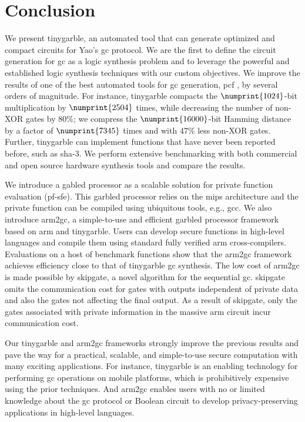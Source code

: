 \chapter{Conclusion}\label{chap:conclusion}
We present \gls{tinygarble}, an automated tool that can generate optimized and compact circuits for Yao's \acrfull{gc} protocol.
We are the first to define the circuit generation for \acrshort{gc} as a logic synthesis problem and to leverage the powerful and established logic synthesis techniques with our custom objectives.
We improve the results of one of the best automated tools for \acrshort{gc} generation, \gls{pcf} \cite{kreuter2013pcf}, by several orders of magnitude. For instance, \gls{tinygarble} compacts the $\numprint{1024}$-bit multiplication by $\numprint{2504}$ times, while decreasing the number of non-XOR gates by 80\%; we compress the $\numprint{16000}$-bit Hamming distance by a factor of $\numprint{7345}$ times and with 47\% less non-XOR gates.
Further, \gls{tinygarble} can implement functions that have never been reported before, such as \acrshort{sha}-3.
We perform extensive benchmarking with both commercial and open source hardware synthesis tools and compare the results.

We introduce a gabled processor as a scalable solution for private function evaluation (\acrshort{pf-sfe}).
This garbled processor relies on the \gls{mips} architecture and the private function can be compiled using ubiquitous tools, e.g., gcc.
We also introduce \gls{arm2gc}, a simple-to-use and efficient garbled processor framework based on \gls{arm} and \gls{tinygarble}.
Users can develop secure functions in high-level languages and compile them using standard fully verified \gls{arm} cross-compilers.
Evaluations on a host of benchmark functions show that the \gls{arm2gc} framework achieves efficiency close to that of \gls{tinygarble} \acrshort{gc} synthesis.
The low cost of \gls{arm2gc} is made possible by \gls{skipgate}, a novel algorithm for the sequential \acrshort{gc}.
\gls{skipgate} omits the communication cost for gates with outputs independent of private data and also the gates not affecting the final output.
As a result of \gls{skipgate}, only the gates associated with private information in the massive \gls{arm} circuit incur communication cost.

Our \gls{tinygarble} and \gls{arm2gc} frameworks strongly improve the previous results and pave the way for a practical, scalable, and simple-to-use secure computation with many exciting applications.
For instance, \gls{tinygarble} is an enabling technology for performing \acrshort{gc} operations on mobile platforms, which is prohibitively expensive using the prior techniques.
And \gls{arm2gc} enables users with no or limited knowledge about the \acrshort{gc} protocol or Boolean circuit to develop privacy-preserving applications in high-level languages.
